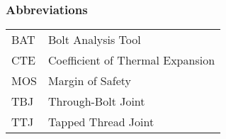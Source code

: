 \subsubsection*{Abbreviations}
\begin{tabular}{p{3cm} l}
  BAT & Bolt Analysis Tool \\
  CTE & Coefficient of Thermal Expansion \\
  MOS & Margin of Safety \\
  TBJ & Through-Bolt Joint \\
  TTJ & Tapped Thread Joint \\
\end{tabular}